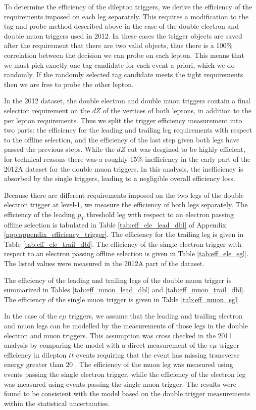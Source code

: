  
To determine the efficiency of the dilepton triggers, 
we derive the efficiency of the requirements imposed on each leg separately.
This requires a modification to the tag and probe method described above in 
the case of the double electron and double muon triggers used in 2012.
In these cases the trigger objects are saved after the requirement that there are two valid objects, 
thus there is a 100\% correlation between the decision we can probe on each lepton.
This means that we must pick exactly one tag candidate for each event a priori, which we do 
randomly. 
If the randomly selected tag candidate meets the tight requirements then we are free to 
probe the other lepton.

In the 2012 dataset, the double electron and double muon triggers contain 
a final selection requirement on the $dZ$ of the vertices of both leptons, 
in addition to the per lepton requirements.  Thus we split the trigger efficiency 
measurement into two parts: the efficiency for the leading and trailing leg 
requirements with respect to the offline selection, and the efficiency of the 
last step given both legs have passed the previous steps.
While the $dZ$ cut was desgined to be highly efficient,
for technical reasons there was a roughly 15\% inefficiency in
the early part of the 2012A dataset for the double muon triggers.
In this analysis, the inefficiency is absorbed by the single triggers, 
leading to a negligible overall efficiency loss.

Because there are different requirements imposed on the two legs of the 
double electron trigger at level-1, we measure the efficiency of 
both legs separately.
The efficiency of the leading $p_T$ threshold leg with respect to an electron passing
offline selection is tabulated in 
Table \ref{tab:eff_ele_lead_dbl} of Appendix 
\ref{app:appendix_efficiency_trigger}. The efficiency for the trailing 
leg is given in Table \ref{tab:eff_ele_trail_dbl}. 
The efficiency of the single electron trigger with respect to
an electron passing offline selection is given in Table \ref{tab:eff_ele_sgl}.
The listed values were measured in the 2012A part of the dataset.

The efficiency of the leading and trailing legs of the double muon trigger
is summarized in Tables \ref{tab:eff_muon_lead_dbl} and
\ref{tab:eff_muon_trail_dbl}. The efficiency of the single
muon trigger is given in Table \ref{tab:eff_muon_sgl}.

In the case of the $e\mu$ triggers, we assume that the leading
and trailing electron and muon legs can be modelled by the measurements
of those legs in the double electron and muon triggers. This assumption was cross 
checked in the 2011 analysis by comparing the model with
a direct measurement of the $e\mu$ trigger efficiency in
dilepton $t\bar{t}$ events requiring that the event has missing transverse
energy greater than $20$ \GeV.
The efficiency of 
the muon leg was measured using events passing the single electron trigger,
while the efficiency of the electron leg was measured using events passing the
single muon trigger. The results were found to be consistent
with the model based on the double trigger measurements within the 
statistical uncertainties. 

